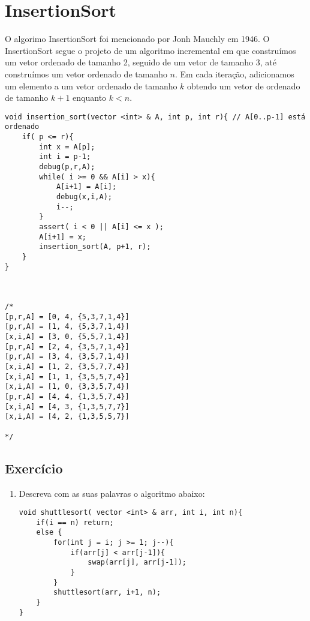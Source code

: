 \section{InsertionSort}

O algorimo InsertionSort foi mencionado por Jonh Mauchly em 1946. O InsertionSort segue o projeto de um algoritmo incremental em que construímos um vetor ordenado de tamanho 2, seguido de um vetor de tamanho 3, até construímos um vetor ordenado de tamanho $n$. Em cada iteração, adicionamos um elemento a um vetor ordenado de tamanho $k$  obtendo um vetor de ordenado de tamanho $k+1$ enquanto $k < n$.





\begin{verbatim}
void insertion_sort(vector <int> & A, int p, int r){ // A[0..p-1] está ordenado
    if( p <= r){
        int x = A[p];
        int i = p-1;
        debug(p,r,A);
        while( i >= 0 && A[i] > x){
            A[i+1] = A[i];
            debug(x,i,A);  
            i--;
        }
        assert( i < 0 || A[i] <= x );
        A[i+1] = x;
        insertion_sort(A, p+1, r);
    }
}



/*
[p,r,A] = [0, 4, {5,3,7,1,4}]
[p,r,A] = [1, 4, {5,3,7,1,4}]
[x,i,A] = [3, 0, {5,5,7,1,4}]
[p,r,A] = [2, 4, {3,5,7,1,4}]
[p,r,A] = [3, 4, {3,5,7,1,4}]
[x,i,A] = [1, 2, {3,5,7,7,4}]
[x,i,A] = [1, 1, {3,5,5,7,4}]
[x,i,A] = [1, 0, {3,3,5,7,4}]
[p,r,A] = [4, 4, {1,3,5,7,4}]
[x,i,A] = [4, 3, {1,3,5,7,7}]
[x,i,A] = [4, 2, {1,3,5,5,7}]

*/
\end{verbatim}

\subsection{Exercício}

\begin{enumerate}
\item Descreva com as suas palavras o algoritmo abaixo:
\begin{verbatim}
void shuttlesort( vector <int> & arr, int i, int n){
    if(i == n) return;
    else {
        for(int j = i; j >= 1; j--){
            if(arr[j] < arr[j-1]){
                swap(arr[j], arr[j-1]);
            }
        }
        shuttlesort(arr, i+1, n);
    }
}
\end{verbatim}
\end{enumerate}


